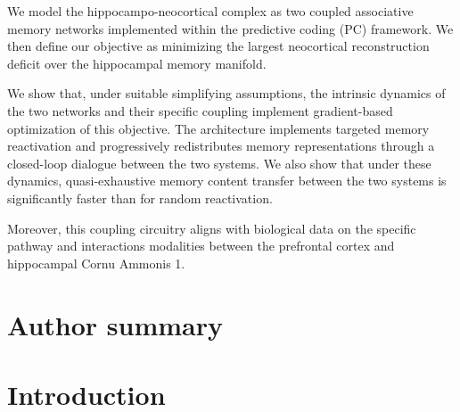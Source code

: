 \documentclass[10pt,letterpaper]{article}
\theoremstyle{plain}
\theoremstyle{remark}
\begin{document}
We model the hippocampo-neocortical complex as two coupled associative memory networks implemented within the predictive coding (PC) framework. We then define our objective as minimizing the largest neocortical reconstruction deficit over the hippocampal memory manifold.

We show that, under suitable simplifying assumptions, the intrinsic dynamics of the two networks and their specific coupling implement gradient-based optimization of this objective. The architecture implements targeted memory reactivation and progressively redistributes memory representations through a closed-loop dialogue between the two systems. We also show that under these dynamics, quasi-exhaustive memory content transfer between the two systems is significantly faster than for random reactivation.

Moreover, this coupling circuitry aligns with biological data on the specific pathway and interactions modalities between the prefrontal cortex and hippocampal Cornu Ammonis 1.

\section*{Author summary}


\linenumbers

\newpage
\section{Introduction}

\end{document}

